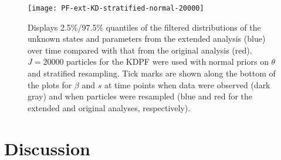 \documentclass{elsarticle}
\begin{document}
\begin{figure}
\centering
\texttt{[image: PF-ext-KD-stratified-normal-20000]}
\caption{Displays 2.5\%/97.5\% quantiles of the filtered distributions of the unknown states and parameters from the extended analysis (blue) over time compared with that from the original analysis (red).  $J = 20000$ particles for the KDPF were used with normal priors on $\theta$ and stratified resampling.  Tick marks are shown along the bottom of the plots for $\beta$ and $s$ at time points when data were observed (dark gray) and when particles were resampled (blue and red for the extended and original analyses, respectively).} \label{fig:ext}
\end{figure}

\section{Discussion \label{sec:discussion}}

\clearpage



\end{document}
